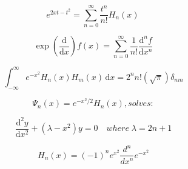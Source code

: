 \[\begin{equation} \label{thrm5.1} e^{2xt-t^{2}}=\sum _{n=0}^{\infty }{\frac {t^{n}}{n!}}H_n(x)\,\! \end{equation}\]

\[\begin{equation} \label{thrm5.3(ii)} \exp{(\frac{\mathrm{d}}{\mathrm{d}x})}f(x) = \sum_{n=0}^{\infty}\frac{1}{n!}\frac{\mathrm{d}^nf}{\mathrm{d}x^n} \end{equation}\]

\[\begin{equation} \label{thrm5.5} \int _{-\infty }^{\infty }e^{-x^2}H_{n}(x)H_{m}(x)\,\mathrm {d} x=2^{n}n!(\sqrt{\pi})\delta _{nm} \end{equation}\]

\[\begin{equation} \label{weberherm(i)} \Psi_n(x) = e^{-x^2/2}H_n(x), solves: \end{equation}\]

\[\begin{equation} \label{weberherm(ii)} \frac{\mathrm{d}^2y}{\mathrm{d}x^2} + (\lambda - x^2)y = 0\quad where\; \lambda = 2n+1 \end{equation}\]

\[\begin{equation} \label{thrm5.2} H_{n}(x)=(-1)^{n}e^{x^{2}}{\frac {d^{n}}{dx^{n}}}e^{-x^{2}} \end{equation}\]

